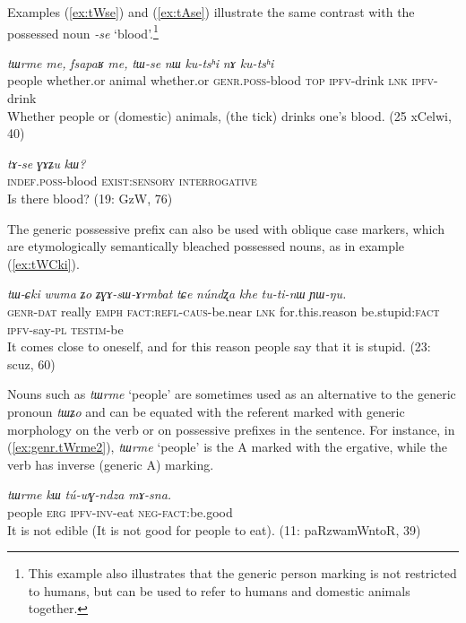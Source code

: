 \documentclass[oneside,a4paper,11pt]{article}
\newcommand{\ipa}[1]{\textit{\phon\mbox{#1}}} %
\newcommand{\refb}[1]{(\ref{#1})}
\begin{document}
Examples \refb{ex:tWse} and \refb{ex:tAse} illustrate the same contrast with the possessed noun \ipa{-se} `blood'.\footnote{This example also illustrates that the generic person marking is not restricted to humans, but can be used to refer to humans and domestic animals together.  }

\begin{exe}
\ex  \label{ex:tWse}
\gll
\ipa{tɯrme} 	\ipa{me,} 	\ipa{fsapaʁ} 	\ipa{me,} 	\ipa{tɯ-se} 	\ipa{nɯ} 	\ipa{ku-tsʰi} 	\ipa{nɤ} 	\ipa{ku-tsʰi} \\
people whether.or animal whether.or \textsc{genr.poss}-blood \textsc{top} \textsc{ipfv}-drink \textsc{lnk} \textsc{ipfv}-drink \\
\glt Whether people or (domestic) animals, (the tick) drinks one's blood. (25 xCelwi, 40)
\end{exe}

\begin{exe}
\ex  \label{ex:tAse}
\gll
\ipa{tɤ-se} 	\ipa{ɣɤʑu} 	\ipa{kɯ?} \\
\textsc{indef.poss}-blood \textsc{exist:sensory} \textsc{interrogative} \\
\glt Is there blood? (19: GzW, 76)
\end{exe}

The generic possessive prefix can also be used with oblique case markers, which are etymologically semantically bleached possessed nouns, as in example \refb{ex:tWCki}.

\begin{exe}
\ex  \label{ex:tWCki}
\gll
\ipa{tɯ-ɕki} 	\ipa{wuma} 	\ipa{ʑo} 	\ipa{ʑɣɤ-sɯ-ɤrmbat} 	\ipa{tɕe} 	\ipa{núndʐa} 	\ipa{khe} 	\ipa{tu-ti-nɯ} 	\ipa{ɲɯ-ŋu.} \\
\textsc{genr-dat} really \textsc{emph} \textsc{fact:refl-caus}-be.near \textsc{lnk} for.this.reason be.stupid:\textsc{fact} \textsc{ipfv}-say-\textsc{pl} \textsc{testim}-be \\
\glt It comes close to oneself, and for this reason people say that it is stupid. (23: scuz, 60)
\end{exe}

Nouns such as \ipa{tɯrme} `people' are sometimes used as an alternative to the generic pronoun \ipa{tɯʑo} and can be equated with the referent marked with generic morphology on the verb or on possessive prefixes in the sentence. For instance, in \refb{ex:genr.tWrme2}, \ipa{tɯrme} `people' is the A marked with the ergative, while the verb has inverse (generic A) marking.


\begin{exe}
\ex  \label{ex:genr.tWrme2}
\gll
\ipa{tɯrme} 	\ipa{kɯ} 	\ipa{tú-wɣ-ndza} 	\ipa{mɤ-sna.} \\
people \textsc{erg} \textsc{ipfv-inv}-eat \textsc{neg-fact}:be.good \\
\glt It is not edible (It is not good for people to eat). (11: paRzwamWntoR, 39)
\end{exe}
\end{document}
